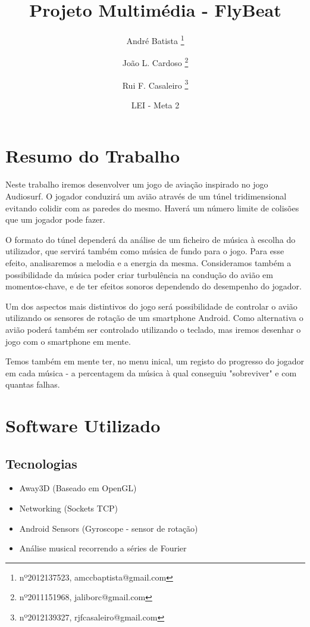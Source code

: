 \documentclass{article}
\title{Projeto Multimédia - FlyBeat}
\author{André Batista \thanks{nº2012137523, amccbaptista@gmail.com} \and João L. Cardoso \thanks{nº2011151968, jaliborc@gmail.com} \and Rui F. Casaleiro \thanks{nº2012139327, rjfcasaleiro@gmail.com}}
\date{LEI - Meta 2}
\begin{document}
\maketitle
\section{Resumo do Trabalho}
Neste trabalho iremos desenvolver um jogo de aviação inspirado no jogo Audiosurf. O jogador conduzirá um avião através de um túnel tridimensional evitando colidir com as paredes do mesmo. Haverá um número limite de colisões que um jogador pode fazer.

O formato do túnel dependerá da análise de um ficheiro de música à escolha do utilizador, que servirá também como música de fundo para o jogo. Para esse efeito, analisaremos a melodia e a energia da mesma. Consideramos também a possibilidade da música poder criar turbulência na condução do avião em momentos-chave, e de ter efeitos sonoros dependendo do desempenho do jogador.

Um dos aspectos mais distintivos do jogo será possibilidade de controlar o
avião utilizando os sensores de rotação de um smartphone Android. Como alternativa o avião poderá também ser controlado utilizando o teclado, mas iremos desenhar o jogo com o smartphone em mente.

Temos também em mente ter, no menu inical, um registo do progresso do jogador em cada música - a percentagem da música à qual conseguiu "sobreviver" e com quantas falhas.

\section{Software Utilizado}
\subsection{Tecnologias}
\begin{itemize}
\item Away3D (Baseado em OpenGL)
\item Networking (Sockets TCP)
\item Android Sensors (Gyroscope - sensor de rotação)
\item Análise musical recorrendo a séries de Fourier
\end{itemize}
\end{document}
